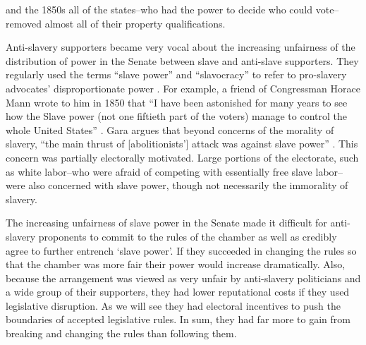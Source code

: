 \documentclass[a4paper]{article}\usepackage[]{graphicx}\usepackage[]{color}
\begin{document}
and the 1850s all of the states--who had the power to decide who could vote--removed almost all of their property qualifications.

Anti-slavery supporters became very vocal about the increasing unfairness of the distribution of power in the Senate between slave and anti-slave supporters. They regularly used the terms ``slave power'' and ``slavocracy'' to refer to pro-slavery advocates' disproportionate power \citep{richards2000}. For example, a friend of Congressman Horace Mann wrote to him in 1850 that ``I have been astonished for many years to see how the Slave power (not one fiftieth part of the voters) manage to control the whole United States'' \citep[quoted in][6]{Gara1969}. Gara argues that beyond concerns of the morality of slavery, ``the main thrust of [abolitionists'] attack was against slave power'' \citeyearpar[6]{Gara1969}. This concern was partially electorally motivated. Large portions of the electorate, such as white labor--who were afraid of competing with essentially free slave labor--were also concerned with slave power, though not necessarily the immorality of slavery. 

The increasing unfairness of slave power in the Senate made it difficult for anti-slavery proponents to commit to the rules of the chamber as well as credibly agree to further entrench `slave power'. If they succeeded in changing the rules so that the chamber was more fair their power would increase dramatically. Also, because the arrangement was viewed as very unfair by anti-slavery politicians and a wide group of their supporters, they had lower reputational costs if they used legislative disruption. As we will see they had electoral incentives to push the boundaries of accepted legislative rules. In sum, they had far more to gain from breaking and changing the rules than following them.
\end{document}
